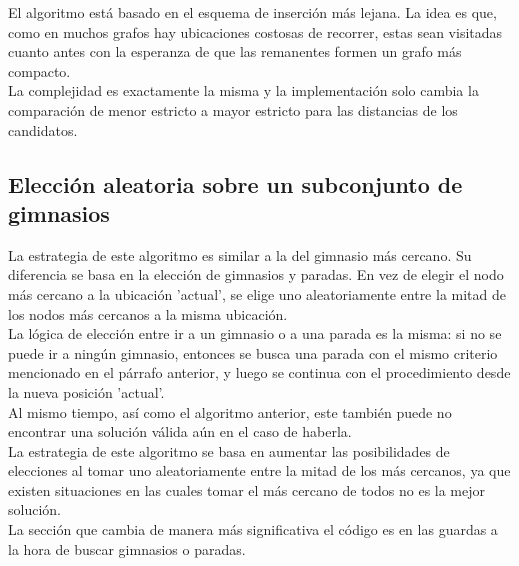     El algoritmo está basado en el esquema de inserción más lejana. La idea es que, como en muchos grafos hay ubicaciones costosas de recorrer, estas sean visitadas cuanto antes con la esperanza de que las remanentes formen un grafo más compacto.
    \\

    La complejidad es exactamente la misma y la implementación solo cambia la comparación de menor estricto a mayor estricto para las distancias de los candidatos.


    \subsection{Elección aleatoria sobre un subconjunto de gimnasios}

    La estrategia de este algoritmo es similar a la del gimnasio más cercano. Su diferencia se basa en la elección de gimnasios y paradas. En vez de elegir el nodo más cercano a la ubicación 'actual', se elige uno aleatoriamente entre la mitad de los nodos más cercanos a la misma ubicación.
    \\

    La lógica de elección entre ir a un gimnasio o a una parada es la misma: si no se puede ir a ningún gimnasio, entonces se busca una parada con el mismo criterio mencionado en el párrafo anterior, y luego se continua con el procedimiento desde la nueva posición 'actual'.
    \\

    Al mismo tiempo, así como el algoritmo anterior, este también puede no encontrar una solución válida aún en el caso de haberla.
    \\

    La estrategia de este algoritmo se basa en aumentar las posibilidades de elecciones al tomar uno aleatoriamente entre la mitad de los más cercanos, ya que existen situaciones en las cuales tomar el más cercano de todos no es la mejor solución.
    \\

    La sección que cambia de manera más significativa el código es en las guardas a la hora de buscar gimnasios o paradas.
    \\

